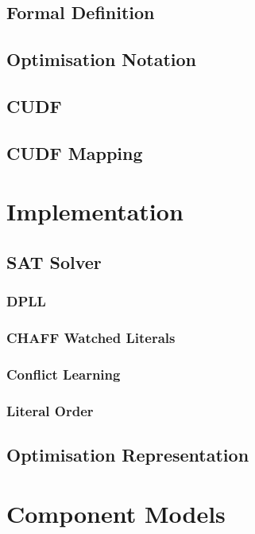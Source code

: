 \documentclass{report}
\begin{document}
\section{Formal Definition}

\section{Optimisation Notation}

\section{CUDF}

\section{CUDF Mapping}

\chapter{Implementation}

\section{SAT Solver}
\subsection{DPLL}
\subsection{CHAFF Watched Literals}
\subsection{Conflict Learning}
\subsection{Literal Order}

\section{Optimisation Representation}

\chapter{Component Models}
\end{document}
